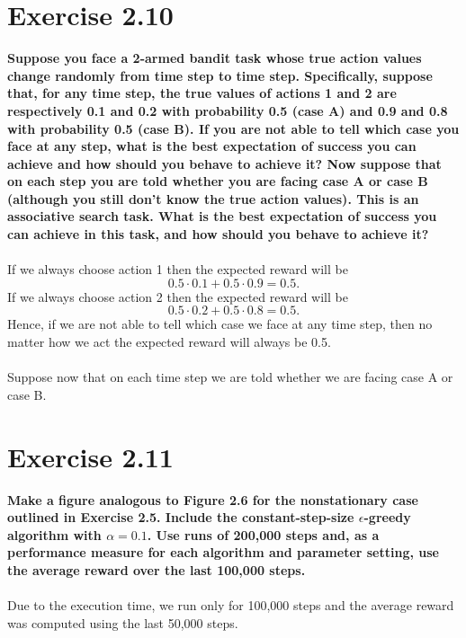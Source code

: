 \documentclass[a4paper,11pt]{article}
\numberwithin{equation}{section}
\theoremstyle{remark}
\begin{document}
\section{Exercise 2.10}

\textbf{Suppose you face a 2-armed bandit task whose true action values change randomly from time step to time step. Specifically, suppose that, for any time step, the true values of actions 1 and 2 are respectively 0.1 and 0.2 with probability 0.5 (case A) and 0.9 and 0.8 with probability 0.5 (case B). If you are not able to tell which case you face at any step, what is the best expectation of success you can achieve and how should you behave to achieve it? Now suppose that on each step you are told whether you are facing case A or case B (although you still don’t know the true action values). This is an associative search task. What is the best expectation of success you can achieve in this task, and how should you behave to achieve it?}
\\ \\
If we always choose action 1 then the expected reward will be 
\[
	0.5\cdot 0.1 + 0.5\cdot 0.9 = 0.5.
\]
If we always choose action 2 then the expected reward will be 
\[
0.5\cdot 0.2 + 0.5\cdot 0.8 = 0.5.
\]
Hence, if we are not able to tell which case we face at any time step, then no matter how we act the expected reward will always be 0.5.
\\ \\
Suppose now that on each time step we are told whether we are facing case A or case B. 


\section{Exercise 2.11}

\textbf{Make a figure analogous to Figure 2.6 for the nonstationary case outlined in Exercise 2.5. Include the constant-step-size $\epsilon$-greedy algorithm with $\alpha=0.1$. Use runs of 200,000 steps and, as a performance measure for each algorithm and parameter setting, use the average reward over the last 100,000 steps.}
\\ \\
Due to the execution time, we run only for 100,000 steps and the average reward was computed using the last 50,000 steps. 
\end{document}
